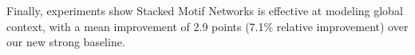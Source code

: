 \documentclass[10pt,twocolumn,letterpaper]{article}
\newcommand{\rowan}[1]{{\color{red}rz:[#1]}}
\newcommand{\model}{\textsc{MotifNet}}
\newcommand{\modellong}{Stacked Motif Network}
\begin{document}
Finally, experiments show {\modellong}s is effective at modeling global context, with a mean improvement of 2.9 points (7.1\% relative improvement) over our new strong baseline. %
\end{document}
